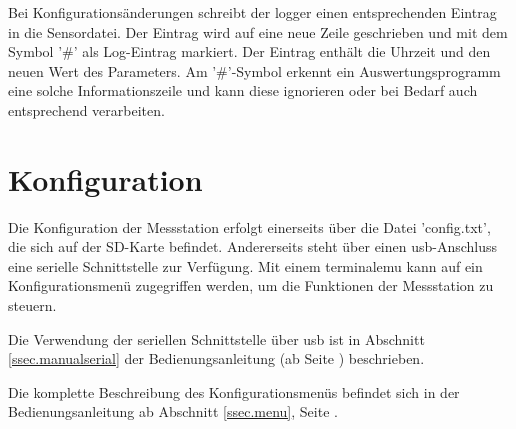 Bei Konfigurationsänderungen schreibt der \gls{logger} einen entsprechenden Eintrag in die Sensordatei. Der Eintrag wird auf eine neue Zeile geschrieben und mit dem Symbol '\#' als Log-Eintrag markiert. Der Eintrag enthält die Uhrzeit und den neuen Wert des Parameters. Am '\#'-Symbol erkennt ein Auswertungsprogramm eine solche Informationszeile und kann diese ignorieren oder bei Bedarf auch entsprechend verarbeiten.



\section{Konfiguration}\label{sec.sw_konfiguration}
Die Konfiguration der Messstation erfolgt einerseits über die Datei 'config.txt', die sich auf der SD-Karte befindet. Andererseits steht über einen \gls{usb}-Anschluss eine serielle Schnittstelle zur Verfügung. Mit einem \gls{terminalemu} kann auf ein Konfigurationsmenü zugegriffen werden, um die Funktionen der Messstation zu steuern.

Die Verwendung der seriellen Schnittstelle über \gls{usb} ist in Abschnitt \ref{ssec.manualserial} der Bedienungsanleitung (ab Seite \pageref{ssec.manualserial}) beschrieben.

Die komplette Beschreibung des Konfigurationsmenüs befindet sich in der Bedienungsanleitung ab Abschnitt \ref{ssec.menu}, Seite \pageref{ssec.menu}.

